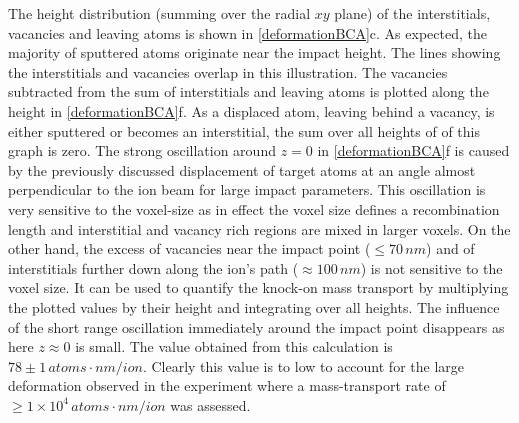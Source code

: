 The height distribution (summing over the radial $xy$ plane) of the interstitials, vacancies and leaving atoms is shown in \ref{deformationBCA}c. As expected, the majority of sputtered atoms originate near the impact height. The lines showing the interstitials and vacancies overlap in this illustration. The vacancies subtracted from the sum of interstitials and leaving atoms is plotted along the height in \ref{deformationBCA}f. As a displaced atom, leaving behind a vacancy, is either sputtered or becomes an interstitial, the sum over all heights of of this graph is zero. The strong oscillation around $z=0$ in \ref{deformationBCA}f is caused by the previously discussed displacement of target atoms at an angle almost perpendicular to the ion beam for large impact parameters. This oscillation is very sensitive to the voxel-size as in effect the voxel size defines a recombination length and interstitial and vacancy rich regions are mixed in larger voxels. On the other hand, the excess of vacancies near the impact point ($\le 70\,nm$) and of interstitials further down along the ion's path ($\approx 100\,nm$) is not sensitive to the voxel size. It can be used to quantify the knock-on mass transport by multiplying the plotted values by their height and integrating over all heights. The influence of the short range oscillation immediately around the impact point disappears as here $z \approx 0$ is small. The value obtained from this calculation is $78\pm1\,atoms \cdot nm /ion$. Clearly this value is to low to account for the large deformation observed in the experiment where a mass-transport rate of $\ge 1\times 10^{4}\,atoms \cdot nm /ion$ was assessed.

